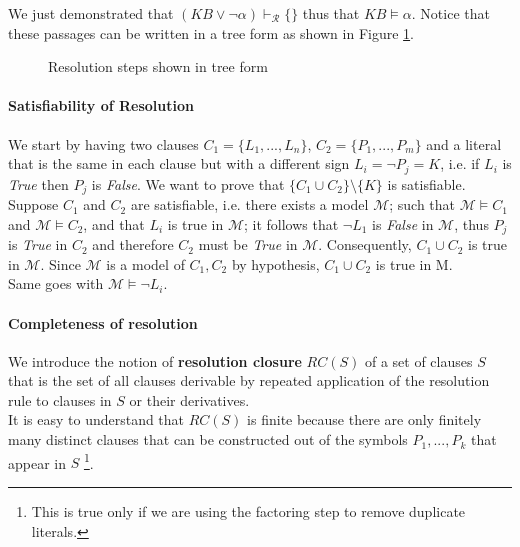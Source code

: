 \documentclass[10pt,a4paper]{article}
\begin{document}
We just demonstrated that $(KB \vee \neg \alpha) \vdash_{\mathcal{R}} \{\}$ thus that $KB\models \alpha$. Notice that these passages can be written in a tree form as shown in Figure \ref{fig:res_expansion}.
\begin{figure}[H]
\centering
{}
\caption{Resolution steps shown in tree form}
\label{fig:res_expansion}
\end{figure}

\paragraph{Satisfiability of Resolution} We start by having two clauses $C_1=\lbrace L_1,...,L_n\rbrace$, $C_2=\lbrace P_1,...,P_m\rbrace$ and a literal that is the same in each clause but with a different sign $L_i=\neg P_j=K$, i.e. if $L_i$ is \textit{True} then $P_j$ is \textit{False}. We want to prove that $\lbrace C_1 \cup C_2 \rbrace \setminus \{K\}$ is satisfiable.\\
Suppose $C_1$ and $C_2$ are satisfiable, i.e. there exists a model $\mathcal{M}$; such that $\mathcal{M}\models C_1$ and $\mathcal{M}\models C_2$, and that $L_i$ is true in $\mathcal{M}$; it follows that $\neg L_1$ is \textit{False} in $\mathcal{M}$, thus $P_j$ is \textit{True} in $C_2$ and therefore $C_2$ must be \textit{True} in $\mathcal{M}$. Consequently, $C_1\cup C_2$ is true in $\mathcal{M}$. Since $\mathcal{M}$ is a model of $C_1,C_2$ by hypothesis, $C_1\cup C_2$  is true in M.\\
Same goes with $\mathcal{M}\models \neg L_i$.


\paragraph{Completeness of resolution} We introduce the notion of \textbf{resolution closure} $RC(S)$ of a set of clauses $S$ that  is the set of all clauses derivable by repeated application of the resolution rule to clauses in $S$ or their derivatives.\\
It is easy to understand that $RC(S)$ is finite because there are only finitely many distinct clauses that can be constructed out of the symbols $P_1, . . . , P_k$ that appear in $S$ \footnote{This is true only if we are using the factoring step to remove duplicate literals.}.\\ 
\end{document}
